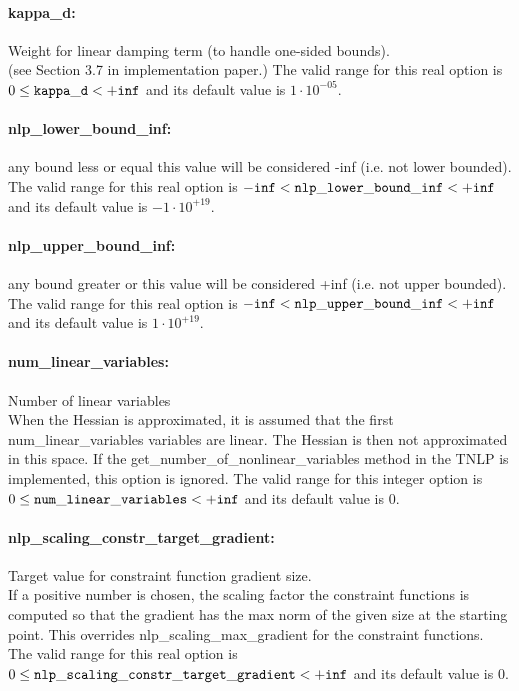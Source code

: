 \paragraph{kappa\_d:}\label{sec:kappa_d} Weight for linear damping term (to handle one-sided bounds). $\;$ \\
 (see Section 3.7 in implementation paper.) The valid range for this real option is 
$0 \le {\tt kappa\_d } <  {\tt +inf}$
and its default value is $1 \cdot 10^{-05}$.


\paragraph{nlp\_lower\_bound\_inf:}\label{sec:nlp_lower_bound_inf} any bound less or equal this value will be considered -inf (i.e. not lower bounded). $\;$ \\
 The valid range for this real option is 
${\tt -inf} <  {\tt nlp\_lower\_bound\_inf } <  {\tt +inf}$
and its default value is $-1 \cdot 10^{+19}$.


\paragraph{nlp\_upper\_bound\_inf:}\label{sec:nlp_upper_bound_inf} any bound greater or this value will be considered +inf (i.e. not upper bounded). $\;$ \\
 The valid range for this real option is 
${\tt -inf} <  {\tt nlp\_upper\_bound\_inf } <  {\tt +inf}$
and its default value is $1 \cdot 10^{+19}$.


\paragraph{num\_linear\_variables:}\label{sec:num_linear_variables} Number of linear variables $\;$ \\
 When the Hessian is approximated, it is assumed
that the first num\_linear\_variables variables
are linear.  The Hessian is then not approximated
in this space.  If the
get\_number\_of\_nonlinear\_variables method in
the TNLP is implemented, this option is ignored. The valid range for this integer option is
$0 \le {\tt num\_linear\_variables } <  {\tt +inf}$
and its default value is $0$.


\paragraph{nlp\_scaling\_constr\_target\_gradient:}\label{sec:nlp_scaling_constr_target_gradient} Target value for constraint function gradient size. $\;$ \\
 If a positive number is chosen, the scaling
factor the constraint functions is computed so
that the gradient has the max norm of the given
size at the starting point.  This overrides
nlp\_scaling\_max\_gradient for the constraint
functions. The valid range for this real option is 
$0 \le {\tt nlp\_scaling\_constr\_target\_gradient } <  {\tt +inf}$
and its default value is $0$.


